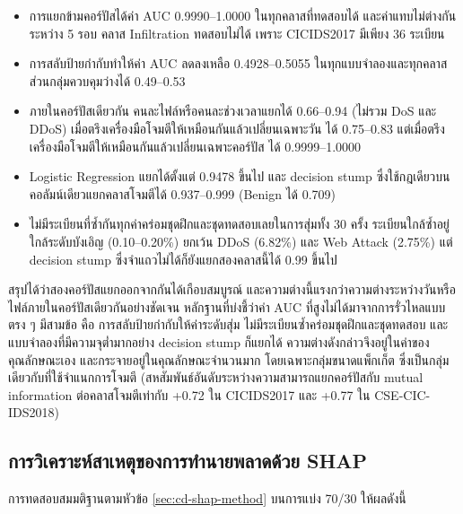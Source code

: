 \begin{itemize}
    \item การแยกข้ามคอร์ปัสได้ค่า AUC 0.9990--1.0000 ในทุกคลาสที่ทดสอบได้ และค่าแทบไม่ต่างกันระหว่าง 5 รอบ คลาส Infiltration ทดสอบไม่ได้ เพราะ CICIDS2017 มีเพียง 36 ระเบียน
    \item การสลับป้ายกำกับทำให้ค่า AUC ลดลงเหลือ 0.4928--0.5055 ในทุกแบบจำลองและทุกคลาส ส่วนกลุ่มควบคุมว่างได้ 0.49--0.53
    \item ภายในคอร์ปัสเดียวกัน คนละไฟล์หรือคนละช่วงเวลาแยกได้ 0.66--0.94 (ไม่รวม DoS และ DDoS) เมื่อตรึงเครื่องมือโจมตีให้เหมือนกันแล้วเปลี่ยนเฉพาะวัน ได้ 0.75--0.83 แต่เมื่อตรึงเครื่องมือโจมตีให้เหมือนกันแล้วเปลี่ยนเฉพาะคอร์ปัส ได้ 0.9999--1.0000
    \item Logistic Regression แยกได้ตั้งแต่ 0.9478 ขึ้นไป และ decision stump ซึ่งใช้กฎเดียวบนคอลัมน์เดียวแยกคลาสโจมตีได้ 0.937--0.999 (Benign ได้ 0.709)
    \item ไม่มีระเบียนที่ซ้ำกันทุกค่าคร่อมชุดฝึกและชุดทดสอบเลยในการสุ่มทั้ง 30 ครั้ง ระเบียนใกล้ซ้ำอยู่ใกล้ระดับบังเอิญ (0.10--0.20\%) ยกเว้น DDoS (6.82\%) และ Web Attack (2.75\%) แต่ decision stump ซึ่งจำแถวไม่ได้ก็ยังแยกสองคลาสนี้ได้ 0.99 ขึ้นไป
\end{itemize}

สรุปได้ว่าสองคอร์ปัสแยกออกจากกันได้เกือบสมบูรณ์ และความต่างนี้แรงกว่าความต่างระหว่างวันหรือไฟล์ภายในคอร์ปัสเดียวกันอย่างชัดเจน หลักฐานที่บ่งชี้ว่าค่า AUC ที่สูงไม่ได้มาจากการรั่วไหลแบบตรง ๆ มีสามข้อ คือ การสลับป้ายกำกับให้ค่าระดับสุ่ม ไม่มีระเบียนซ้ำคร่อมชุดฝึกและชุดทดสอบ และแบบจำลองที่มีความจุต่ำมากอย่าง decision stump ก็แยกได้ ความต่างดังกล่าวจึงอยู่ในค่าของคุณลักษณะเอง และกระจายอยู่ในคุณลักษณะจำนวนมาก โดยเฉพาะกลุ่มขนาดแพ็กเก็ต ซึ่งเป็นกลุ่มเดียวกับที่ใช้จำแนกการโจมตี (สหสัมพันธ์อันดับระหว่างความสามารถแยกคอร์ปัสกับ mutual information ต่อคลาสโจมตีเท่ากับ +0.72 ใน CICIDS2017 และ +0.77 ใน CSE-CIC-IDS2018)

\subsection{การวิเคราะห์สาเหตุของการทำนายพลาดด้วย SHAP}
\label{sec:cd-shap}

การทดสอบสมมติฐานตามหัวข้อ \ref{sec:cd-shap-method} บนการแบ่ง 70/30 ให้ผลดังนี้

